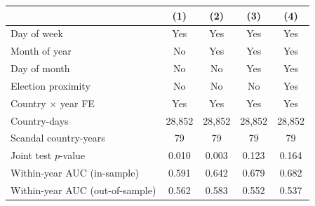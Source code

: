 \begin{tabular}{lcccc}
\toprule
 & (1) & (2) & (3) & (4) \\
\midrule
Day of week & Yes & Yes & Yes & Yes \\
Month of year & No & Yes & Yes & Yes \\
Day of month & No & No & Yes & Yes \\
Election proximity & No & No & No & Yes \\
Country $\times$ year FE & Yes & Yes & Yes & Yes \\
\midrule
Country-days &    28,852 &    28,852 &    28,852 &    28,852 \\
Scandal country-years &   79 &   79 &   79 &   79 \\
Joint test $p$-value & 0.010 & 0.003 & 0.123 & 0.164 \\
Within-year AUC (in-sample) & 0.591 & 0.642 & 0.679 & 0.682 \\
Within-year AUC (out-of-sample) & 0.562 & 0.583 & 0.552 & 0.537 \\
\bottomrule
\end{tabular}
